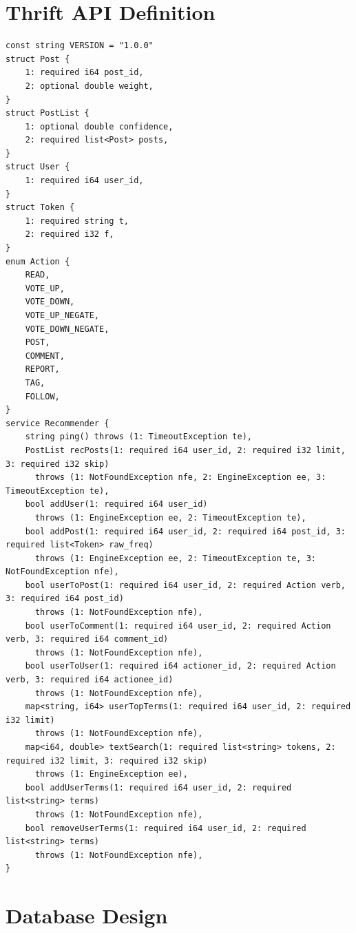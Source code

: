 \documentclass[11pt,letterpaper,titlepage]{article}
\begin{document}
\newpage
\appendix
\section{Thrift API Definition}
\label{app:thrift}
\begin{verbatim}
const string VERSION = "1.0.0"
struct Post {
    1: required i64 post_id,
    2: optional double weight,
}
struct PostList {
    1: optional double confidence,
    2: required list<Post> posts,
}
struct User {
    1: required i64 user_id,
}
struct Token {
    1: required string t,
    2: required i32 f,
}
enum Action {
    READ,
    VOTE_UP,
    VOTE_DOWN,
    VOTE_UP_NEGATE,
    VOTE_DOWN_NEGATE,
    POST,
    COMMENT,
    REPORT,
    TAG,
    FOLLOW,
}
service Recommender {
    string ping() throws (1: TimeoutException te),
    PostList recPosts(1: required i64 user_id, 2: required i32 limit, 3: required i32 skip)
      throws (1: NotFoundException nfe, 2: EngineException ee, 3: TimeoutException te),
    bool addUser(1: required i64 user_id)
      throws (1: EngineException ee, 2: TimeoutException te),
    bool addPost(1: required i64 user_id, 2: required i64 post_id, 3: required list<Token> raw_freq)
      throws (1: EngineException ee, 2: TimeoutException te, 3: NotFoundException nfe),
    bool userToPost(1: required i64 user_id, 2: required Action verb, 3: required i64 post_id)
      throws (1: NotFoundException nfe),
    bool userToComment(1: required i64 user_id, 2: required Action verb, 3: required i64 comment_id)
      throws (1: NotFoundException nfe),
    bool userToUser(1: required i64 actioner_id, 2: required Action verb, 3: required i64 actionee_id)
      throws (1: NotFoundException nfe),
    map<string, i64> userTopTerms(1: required i64 user_id, 2: required i32 limit)
      throws (1: NotFoundException nfe),
    map<i64, double> textSearch(1: required list<string> tokens, 2: required i32 limit, 3: required i32 skip)
      throws (1: EngineException ee),
    bool addUserTerms(1: required i64 user_id, 2: required list<string> terms)
      throws (1: NotFoundException nfe),
    bool removeUserTerms(1: required i64 user_id, 2: required list<string> terms)
      throws (1: NotFoundException nfe),
}
\end{verbatim}

\section{Database Design}
\end{document}
